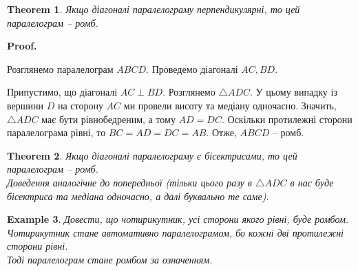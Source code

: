 \documentclass[a4paper, 10pt]{article}
\makeatletter
\def\qed{$\blacksquare$}
\theoremstyle{theoremdd}
\newtheorem{theorem}{Theorem}[subsection]
\theoremstyle{theoremdd}
\theoremstyle{theoremdd}
\theoremstyle{theoremdd}
\theoremstyle{theoremdd}
\newtheorem{example}[theorem]{Example}
\theoremstyle{theoremdd}
\theoremstyle{theoremdd}
\theoremstyle{theoremdd}
\theoremstyle{theoremdd}
\renewenvironment{proof}[1][Proof.\\]{\par
\pushQED{\hfill \qed}%
\normalfont \topsep6\p@\@plus6\p@\relax
\trivlist
\item\relax
{\bfseries
#1\@addpunct{.}}\hspace\labelsep\ignorespaces
}{%
\popQED\endtrivlist\@endpefalse
}
\makeatother
\begin{document}
\begin{theorem}
Якщо діагоналі паралелограму перпендикулярні, то цей паралелограм -- ромб.
\end{theorem}

\begin{proof}
Розглянемо паралелограм $ABCD$. Проведемо діагоналі $AC,BD$.
\begin{figure}[H]
\centering
{}
\end{figure}
Припустимо, що діагоналі $AC \perp BD$. Розглянемо $\triangle ADC$. У цьому випадку із вершини $D$ на сторону $AC$ ми провели висоту та медіану одночасно. Значить, $\triangle ADC$ має бути рівнобедреним, а тому $AD = DC$. Оскільки протилежні сторони паралелограма рівні, то $BC = AD = DC = AB$. Отже, $ABCD$ -- ромб.
\end{proof}

\begin{theorem}
Якщо діагоналі паралелограму є бісектрисами, то цей паралелограм -- ромб.\\
\textit{Доведення аналогічне до попередньої (тільки цього разу в $\triangle ADC$ в нас буде бісектриса та медіана одночасно, а далі буквально те саме).}
\end{theorem}

\begin{example}
Довести, що чотирикутник, усі сторони якого рівні, буде ромбом.\\
Чотирикутник стане автомативно паралелограмом, бо кожні дві протилежні сторони рівні.\\
Тоді паралелограм стане ромбом за означенням.
\end{example}
\end{document}
